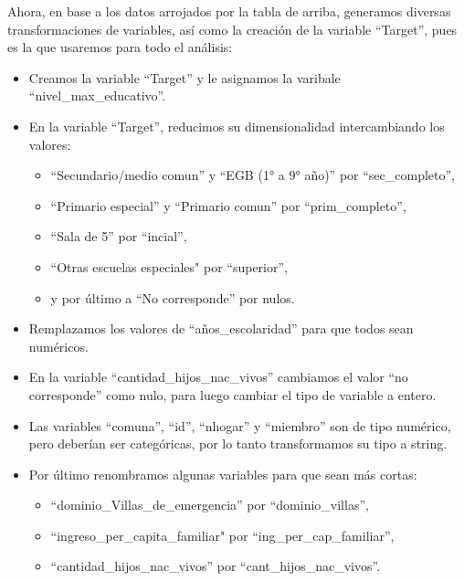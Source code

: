 \documentclass[a4paper]{article}
\begin{document}
    Ahora, en base a los datos arrojados por la tabla de arriba, generamos diversas transformaciones de variables, así como la creación de la variable ``Target'', pues es la que usaremos para todo el análisis:
    \begin{itemize}
        \item Creamos la variable ``Target'' y le asignamos la varibale ``nivel\_max\_educativo''.
        \item En la variable ``Target'', reducimos su dimensionalidad intercambiando los valores:
            \begin{itemize}
                \item ``Secundario/medio comun'' y ``EGB (1° a 9° año)'' por ``sec\_completo'',
                \item ``Primario especial'' y ``Primario comun'' por ``prim\_completo'',
                \item ``Sala de 5'' por ``incial'',
                \item ``Otras escuelas especiales" por ``superior'',
                \item y por último a ``No corresponde'' por nulos.
            \end{itemize}
        \item Remplazamos los valores de ``años\_escolaridad'' para que todos sean numéricos.
        \item En la variable ``cantidad\_hijos\_nac\_vivos'' cambiamos el valor ``no corresponde'' como nulo, para luego cambiar el tipo de variable a entero.
        \item Las variables ``comuna'', ``id'', ``nhogar'' y ``miembro'' son de tipo numérico, pero deberían ser categóricas, por lo tanto transformamos su tipo a string.
        \item Por último renombramos algunas variables para que sean más cortas:
            \begin{itemize}
                \item ``dominio\_Villas\_de\_emergencia'' por ``dominio\_villas'',
                \item ``ingreso\_per\_capita\_familiar" por ``ing\_per\_cap\_familiar'',
                \item ``cantidad\_hijos\_nac\_vivos'' por ``cant\_hijos\_nac\_vivos''.
            \end{itemize}
    \end{itemize}
 
\end{document}
